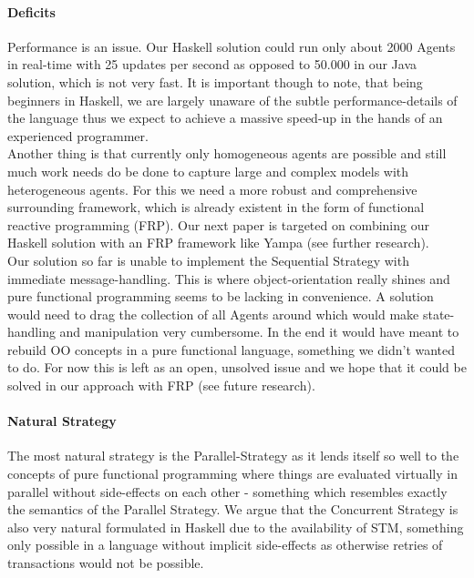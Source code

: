 \paragraph{Deficits}
Performance is an issue. Our Haskell solution could run only about 2000 Agents in real-time with 25 updates per second as opposed to 50.000 in our Java solution, which is not very fast. It is important though to note, that being beginners in Haskell, we are largely unaware of the subtle performance-details of the language thus we expect to achieve a massive speed-up in the hands of an experienced programmer. \\

Another thing is that currently only homogeneous agents are possible and still much work needs do be done to capture large and complex models with heterogeneous agents. For this we need a more robust and comprehensive surrounding framework, which is already existent in the form of functional reactive programming (FRP). Our next paper is targeted on combining our Haskell solution with an FRP framework like Yampa (see further research). \\ 

Our solution so far is unable to implement the Sequential Strategy with immediate message-handling. This is where object-orientation really shines and pure functional programming seems to be lacking in convenience. A solution would need to drag the collection of all Agents around which would make state-handling and manipulation very cumbersome. In the end it would have meant to rebuild OO concepts in a pure functional language, something we didn't wanted to do. For now this is left as an open, unsolved issue and we hope that it could be solved in our approach with FRP (see future research).

\paragraph{Natural Strategy}
The most natural strategy is the Parallel-Strategy as it lends itself so well to the concepts of pure functional programming where things are evaluated virtually in parallel without side-effects on each other - something which resembles exactly the semantics of the Parallel Strategy. We argue that the Concurrent Strategy is also very natural formulated in Haskell due to the availability of STM, something only possible in a language without implicit side-effects as otherwise retries of transactions would not be possible.



